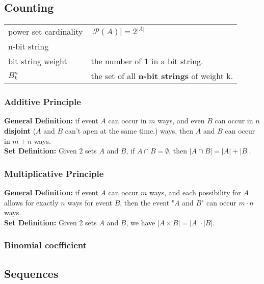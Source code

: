 \documentclass[5pt]{article}
\begin{document}
\begin{multicols}{2}
\subsection{Counting}

\begin{tabular}{ll}
    power set cardinality   & $|\mathcal{P}(A)|=2^{|A|}$\\
    n-bit string            & \\
    bit string weight       & the number of \textbf{1} in a bit string.\\
    $B^n_k$                 & the set of all \textbf{n-bit strings} of weight k.\\
\end{tabular}

\subsubsection{Additive Principle}
\textbf{General Definition:} 
if event $A$ can occur in $m$ ways, and even $B$ can occur in $n$ \textbf{disjoint} ($A$ and $B$ can't apen at the same time.) ways, then $A$ and $B$ can occur in $m+n$ ways.\\   
\textbf{Set Definition:} Given 2 sets $A$ and $B$, if $A\cap B =\emptyset$, then $|A\cap B| = |A| + |B|$.


\subsubsection{Multiplicative Principle}
\textbf{General Definition:} if event $A$ can occur $m$ ways, and each possibility for $A$ allows for exactly $n$ ways for event $B$, then the event "$A$ and $B$" can occur $m\cdot n$ ways.\\
\textbf{Set Definition:} Given 2 sets $A$ and $B$, we have $|A\times B|=|A|\cdot|B|$.

\subsubsection{Binomial coefficient}

\subsection{Sequences}


\end{multicols}
\end{document}
